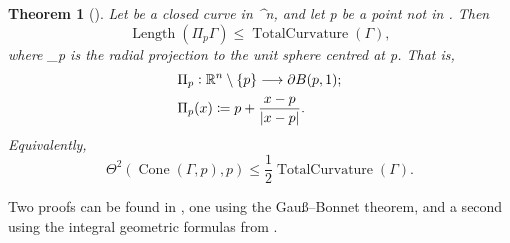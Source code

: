 \documentclass[a4paper, 11pt]{article}
\theoremstyle{plain}
\newtheorem{theorem}{Theorem}[section]
\theoremstyle{definition}
\theoremstyle{remark}
\numberwithin{equation}{subsection}
\def\({}
\def\){}
\def\pi{}
\begin{document}
\begin{theorem}[{\cite[Theorem 1.1]{EWW02}}]
\label{Interior_Regularity_2}
Let \(\Gamma\) be a closed curve in \(^{n}\), and let \(p\) be a point not in \(\Gamma\). Then
\begin{equation}
\operatorname{Length}(\Pi_{p}\Gamma) \leqslant \operatorname{TotalCurvature}(\Gamma),
\end{equation}
where \(\Pi_{p}\) is the radial projection to the unit sphere centred at \(p\). That is,
\begin{align*}
&\Pi_{p} \vcentcolon \mathbb{R}^{n} \setminus \{p\} \longrightarrow \partial B(p,1); \\
&\Pi_{p}(x) \coloneq p + \frac{x-p}{|x-p|}.
\end{align*}
Equivalently,
\begin{equation}
\Theta^{2}(\operatorname{Cone}(\Gamma, p), p) \leqslant \frac{1}{2\pi}\operatorname{TotalCurvature}(\Gamma).
\end{equation}
\end{theorem}

Two proofs can be found in \cite{EWW02}, one using the Gau\ss--Bonnet theorem, and a second using the integral geometric formulas from \cite{Mil50}.
\end{document}
